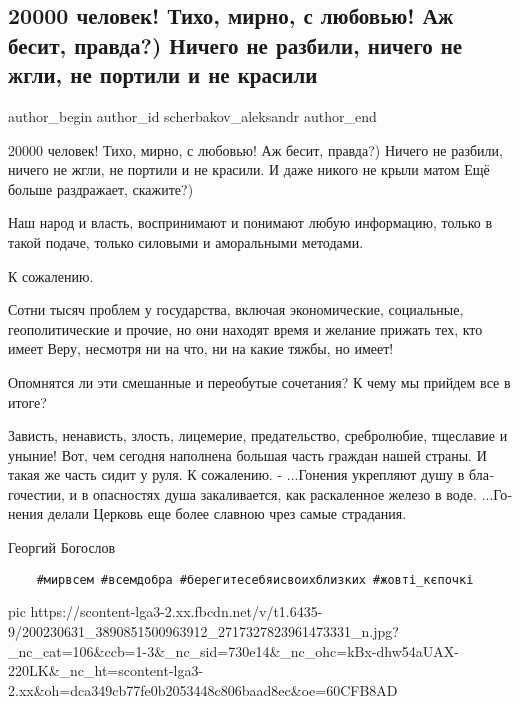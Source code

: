  
 
 
 
 
 
\subsection{20000 человек! Тихо, мирно, с любовью! Аж бесит, правда?) Ничего не разбили, ничего не жгли, не портили и не красили}
\label{sec:16_06_2021.fb.scherbakov_aleksandr.1.protest_upc_vru_kiev}
\ifcmt
 author_begin
   author_id scherbakov_aleksandr
 author_end
\fi

20000 человек! 
Тихо, мирно, с любовью!
Аж бесит, правда?)
Ничего не разбили, ничего не жгли, не портили и не красили. 
И даже никого не крыли матом
Ещё больше раздражает, скажите?)

Наш народ и власть, воспринимают и понимают любую информацию, только в такой
подаче, только силовыми и аморальными методами. 

К сожалению.

Сотни тысяч проблем у государства, включая экономические, социальные, геополитические и прочие, но они находят время и желание прижать тех, кто имеет Веру, несмотря ни на что, ни на какие тяжбы, но имеет! 

Опомнятся ли эти смешанные и переобутые сочетания?
К чему мы прийдем все в итоге?

Зависть, ненависть, злость, лицемерие, предательство, сребролюбие, тщеславие и
уныние! Вот, чем сегодня наполнена большая часть граждан нашей страны. И такая
же часть сидит у руля. К сожалению.
-
...Го­нения ук­репля­ют ду­шу в бла­гочес­тии, и в опас­ностях ду­ша за­кали­ва­ет­ся, как рас­ка­лен­ное же­лезо в во­де.
...Го­нения де­лали Цер­ковь еще бо­лее слав­ною чрез са­мые стра­дания.

Георгий Богослов 

\begin{verbatim}
	#мирвсем #всемдобра #берегитесебяисвоихблизких #жовті_кєпочкі
\end{verbatim}

\ifcmt
  pic https://scontent-lga3-2.xx.fbcdn.net/v/t1.6435-9/200230631_3890851500963912_2717327823961473331_n.jpg?_nc_cat=106&ccb=1-3&_nc_sid=730e14&_nc_ohc=kBx-dhw54aUAX-220LK&_nc_ht=scontent-lga3-2.xx&oh=dca349cb77fe0b2053448c806baad8ec&oe=60CFB8AD
\fi
